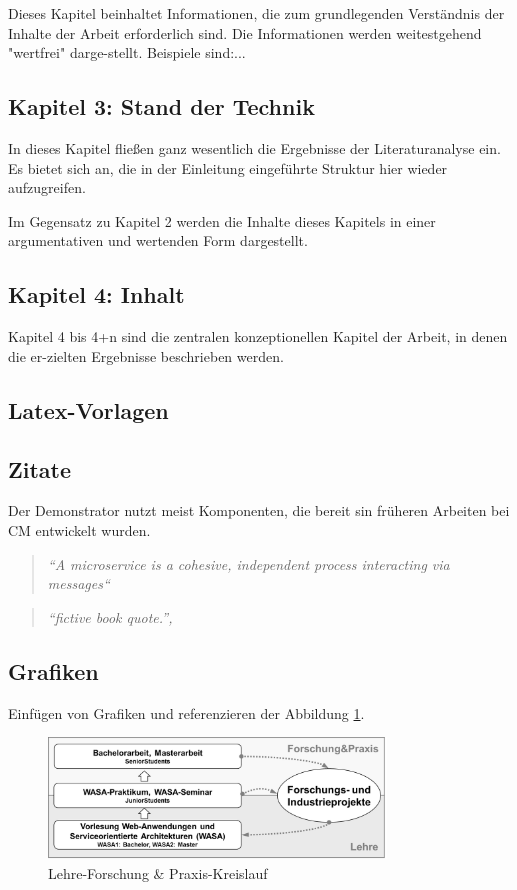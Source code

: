 Dieses Kapitel beinhaltet Informationen, die zum grundlegenden Verständnis der Inhalte der Arbeit erforderlich sind. Die Informationen werden weitestgehend "wertfrei" darge-stellt. Beispiele sind:...

\subsection*{Kapitel 3: Stand der Technik}

In dieses Kapitel fließen ganz wesentlich die Ergebnisse der Literaturanalyse ein. Es bietet sich an, die in der Einleitung eingeführte Struktur hier wieder aufzugreifen.

Im Gegensatz zu Kapitel 2 werden die Inhalte dieses Kapitels in einer argumentativen und wertenden Form dargestellt.

\subsection*{Kapitel 4: Inhalt}

Kapitel 4 bis 4+n sind die zentralen konzeptionellen Kapitel der Arbeit, in denen die er-zielten Ergebnisse beschrieben werden.

\subsection{Latex-Vorlagen}

\subsection{Zitate}
\label{subsec:zitate}
Der Demonstrator nutzt meist Komponenten, die bereit sin früheren Arbeiten bei \gls{CM} entwickelt wurden.
\begin{quote}
\textit{``A microservice is a cohesive, independent process interacting via messages``}
\end{quote}
\begin{quote}
\textit{``fictive book quote.'', \cite[S.~99]{Be02}}
\end{quote}

\subsection{Grafiken}
Einfügen von Grafiken und referenzieren der Abbildung \ref{fig:lehre}.
\begin{figure}[h]
	\centering
	\includegraphics[width=0.8\textwidth]{images/lehre_kreislauf.png}
	\caption{Lehre-Forschung \& Praxis-Kreislauf}
	\label{fig:lehre}
\end{figure}

